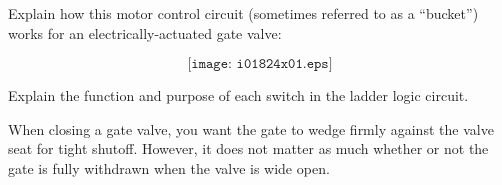 

Explain how this motor control circuit (sometimes referred to as a ``bucket'') works for an electrically-actuated gate valve:

$$\texttt{[image: i01824x01.eps]}$$

Explain the function and purpose of each switch in the ladder logic circuit.







When closing a gate valve, you want the gate to wedge firmly against the valve seat for tight shutoff.  However, it does not matter as much whether or not the gate is fully withdrawn when the valve is wide open.
 









